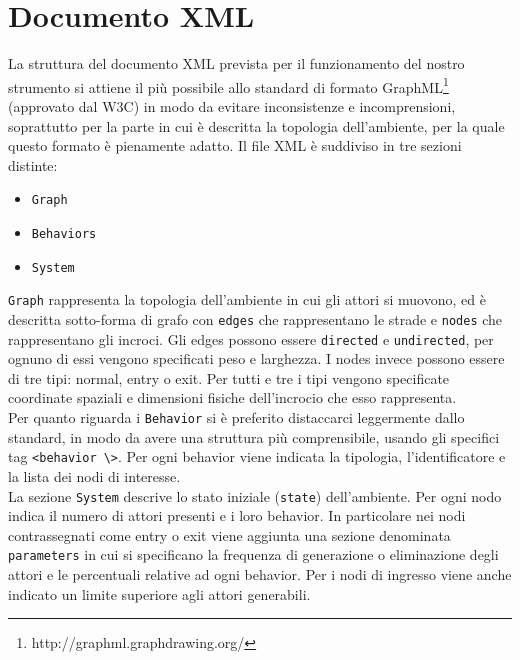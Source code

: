 \section{Documento XML}
La struttura del documento XML prevista per il funzionamento del nostro strumento si attiene il più possibile allo standard di formato GraphML\footnote{http://graphml.graphdrawing.org/} (approvato dal W3C) in modo da evitare inconsistenze e incomprensioni, soprattutto per la parte in cui è descritta la topologia dell'ambiente, per la quale questo formato è pienamente adatto.
Il file XML è suddiviso in tre sezioni distinte:
\begin{itemize}
\item \texttt{Graph}
\item \texttt{Behaviors}
\item \texttt{System}
\end{itemize} 
\texttt{Graph} rappresenta la topologia dell'ambiente in cui gli attori si muovono, ed è descritta sotto-forma di grafo con \texttt{edges} che rappresentano le strade e \texttt{nodes} che rappresentano gli incroci. Gli edges possono essere \texttt{directed} e \texttt{undirected}, per ognuno di essi vengono specificati peso e larghezza. I nodes invece possono essere di tre tipi: normal, entry o exit. Per tutti e tre i tipi vengono specificate coordinate spaziali e dimensioni fisiche dell'incrocio che esso rappresenta.\\
Per quanto riguarda i \texttt{Behavior} si è preferito distaccarci leggermente dallo standard, in modo da avere una struttura più comprensibile, usando gli specifici tag \texttt{<behavior \textbackslash>}. Per ogni behavior viene indicata la tipologia, l'identificatore e la lista dei nodi di interesse.\\
La sezione \texttt{System} descrive lo stato iniziale (\texttt{state}) dell'ambiente. Per ogni nodo indica il numero di attori presenti e i loro behavior. In particolare nei nodi contrassegnati come entry o exit viene aggiunta una sezione denominata \texttt{parameters} in cui si specificano la frequenza di generazione o eliminazione degli attori e le percentuali relative ad ogni behavior. Per i nodi di ingresso viene anche indicato un limite superiore agli attori generabili.

